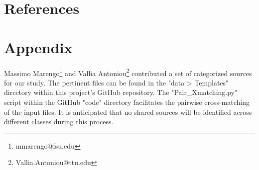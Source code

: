 \documentclass[a4paper, 15pt,usenatbib]{article}
\begin{document}
\section{References}
%
%






\clearpage
\appendix
\section*{Appendix}

Massimo Marengo\footnote{mmarengo@fsu.edu} and Vallia Antoniou\footnote{Vallia.Antoniou@ttu.edu} contributed a set of categorized sources for our study. The pertinent files can be found in the "data > Templates" directory within this project's GitHub repository. The "Pair\_Xmatching.py" script within the GitHub "code" directory facilitates the pairwise cross-matching of the input files. It is anticipated that no shared sources will be identified across different classes during this process.
\end{document}
